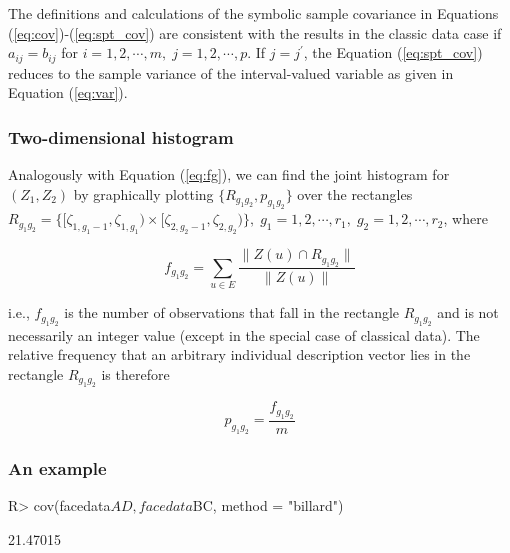 \documentclass[article]{jss}
\begin{document}
\begin{CodeChunk}
The definitions and calculations of the symbolic sample covariance in
Equations (\ref{eq:cov})-(\ref{eq:spt_cov}) are consistent with the results in the classic data case if $a_{ij}=b_{ij}$ for $i = 1,2,\cdots,m ,\; j = 1,2,\cdots, p$. If $j = j^\prime$, the Equation (\ref{eq:spt_cov}) reduces to the sample variance of the interval-valued variable as given in Equation (\ref{eq:var}).



\subsubsection{Two-dimensional histogram} \label{sec:hist2d}

Analogously with Equation (\ref{eq:fg}), we can find the joint histogram
for $(Z_1, Z_2)$ by graphically plotting $\{R_{g_1g_2},p_{g_1g_2}\}$ over the rectangles $R_{g_1g_2} = \{[\zeta_{1,g_1-1},\zeta_{1,g_1}) \times [\zeta_{2,g_2-1},\zeta_{2,g_2}) \},\; g_1 = 1,2,\cdots,r_1, \;g_2=1,2,\cdots,r_2$, where

\begin{equation}\label{eq:bi_fg}
f_{g_1g_2} = \sum_{u \in E}\frac{\| Z(u) \cap R_{g_1g_2} \|}{\| Z(u) \|}
\end{equation}

i.e., $f_{g_1g_2}$ is the number of observations that fall in the rectangle $R_{g_1g_2}$ and is not necessarily an integer value (except in the special case of classical data). The relative frequency that an arbitrary individual description vector lies in the rectangle $R_{g_1g_2}$ is therefore

\begin{equation}\label{eq:bi_rel_fg}
p_{g_1g_2} = \frac{f_{g_1g_2}}{m}
\end{equation}



\subsubsection{An example}

\begin{CodeInput}
R> cov(facedata$AD, facedata$BC, method = "billard")
\end{CodeInput}
\begin{CodeOutput}
[1] 21.47015
\end{CodeOutput}
\end{CodeChunk}
\end{document}
